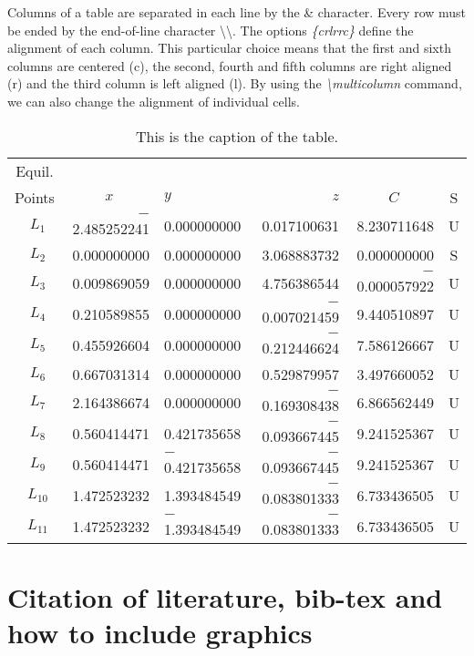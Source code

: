 \documentclass[aodsor,preprint]{imsart}
\numberwithin{equation}{section}
\theoremstyle{plain}
\begin{document}
Columns of a table are separated in each line by the \& character. Every row must be ended by the end-of-line character \textbackslash\textbackslash. The options \emph{\{crlrrc\}} define the alignment of each column. This particular choice means that the first and sixth columns are centered (c), the second, fourth and fifth columns are right aligned (r) and the third column is left aligned (l). By using the \emph{\textbackslash multicolumn} command, we can also change the alignment of individual cells.


\begin{table*}
\caption{This is the caption of the table.}
\label{tab:example}
\begin{tabular}{crlrrc}
\hline
Equil. \\
Points & \multicolumn{1}{c}{$x$} & \multicolumn{1}{l}{$y$} & \multicolumn{1}{r}{$z$} & \multicolumn{1}{c}{$C$} &
S \\
\hline
$~~L_1$ & $-$2.485252241 & 0.000000000 & 0.017100631 & 8.230711648 & U \\
$~~L_2$ &    0.000000000 & 0.000000000 & 3.068883732 & 0.000000000 & S \\
$~~L_3$ &    0.009869059 & 0.000000000 & 4.756386544 & $-$0.000057922 & U \\
$~~L_4$ &    0.210589855 & 0.000000000 & $-$0.007021459 & 9.440510897 & U \\
$~~L_5$ &    0.455926604 & 0.000000000 & $-$0.212446624 & 7.586126667 & U \\
$~~L_6$ &    0.667031314 & 0.000000000 & 0.529879957 & 3.497660052 & U \\
$~~L_7$ &    2.164386674 & 0.000000000 & $-$0.169308438 & 6.866562449 & U \\
$~~L_8$ &    0.560414471 & 0.421735658 & $-$0.093667445 & 9.241525367 & U \\
$~~L_9$ &    0.560414471 & $-$0.421735658 & $-$0.093667445 & 9.241525367 & U
\\
$~~L_{10}$ & 1.472523232 & 1.393484549 & $-$0.083801333 & 6.733436505 & U \\
$~~L_{11}$ & 1.472523232 & $-$1.393484549 & $-$0.083801333 & 6.733436505 & U
\\ \hline
\end{tabular}
\end{table*}


\section{Citation of literature, bib-tex and how to include graphics}
\end{document}
